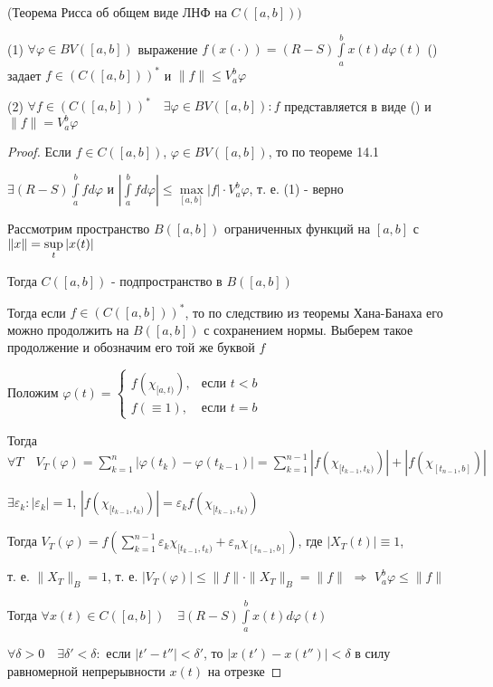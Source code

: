 \documentclass[a4paper,12pt]{report}
\newcommand*{\hm}[1]{#1\nobreak\discretionary{}%
            {\hbox{$\mathsurround=0pt #1$}}{}}
\begin{document}
\begin{thm} \textup{(Теорема Рисса об общем виде ЛНФ на} $C([a,b]))$

(1) $\forall\varphi\in BV([a,b])$ выражение $f(x(\cdot))=(R-S)\displaystyle\int\limits_a^b x(t)d\varphi(t)$ () задает $f\in\left(C([a,b])\right)^*$ и $\|f\|\le V_a^b\varphi$

(2) $\forall f\in\left(C([a,b])\right)^*\quad\exists\varphi\in BV([a,b])\colon f$ представляется в виде () и $\|f\|=V_a^b\varphi$
\end{thm}
\begin{proof}
Если $f\in C([a,b])$, $\varphi\in BV([a,b])$, то по теореме 14.1 

$\exists(R-S)\displaystyle\int\limits_a^b fd\varphi$ и $\left|\displaystyle\int\limits_a^b fd\varphi\right|\le\max\limits_{[a,b]}|f|\cdot V_a^b\varphi$, т. е. (1) - верно

Рассмотрим пространство $B([a,b])$ ограниченных функций на $[a,b]$ с $\|x\|\hm=\sup\limits_t|x(t)|$

Тогда $C([a,b])$ - подпространство в $B([a,b])$

Тогда если $f\in\left(C([a,b])\right)^*$, то по следствию из теоремы Хана-Банаха его можно продолжить на $B([a,b])$ с сохранением нормы. Выберем такое продолжение и обозначим его той же буквой $f$ 

Положим $\varphi(t)=\begin{cases}f(\chi_{[a,t)}),&\text{если }t<b\\f(\equiv1),&\text{если }t=b\end{cases}$

Тогда $\forall T\quad V_T(\varphi)=\sum\limits_{k=1}^n|\varphi(t_k)-\varphi(t_{k-1})|=\sum\limits_{k=1}^{n-1}|f(\chi_{[t_{k-1},t_k)})|+|f(\chi_{[t_{n-1},b]})|$

$\exists \varepsilon_k\colon|\varepsilon_k|=1$, $|f(\chi_{[t_{k-1},t_k)})|=\varepsilon_k f(\chi_{[t_{k-1},t_k)})$

Тогда $V_T(\varphi)=f\left(\sum\limits_{k=1}^{n-1}\varepsilon_k\chi_{[t_{k-1},t_k)}+\varepsilon_n\chi_{[t_{n-1},b]}\right)$, где $|X_T(t)|\equiv1$, 

\noindent т. е. $\|X_T\|_B=1$, т. е. $|V_T(\varphi)|\le\|f\|\cdot\|X_T\|_B=\|f\|$ $\Rightarrow$ $V_a^b\varphi\le\|f\|$

Тогда $\forall x(t)\in C([a,b])\quad\exists(R-S)\displaystyle\int\limits_a^b x(t)d\varphi(t)$

$\forall\delta>0\quad\exists\delta'<\delta\colon$ если $|t'-t''|<\delta'$, то $|x(t')-x(t'')|<\delta$ в силу равномерной непрерывности $x(t)$ на отрезке


\end{proof}
\end{document}
